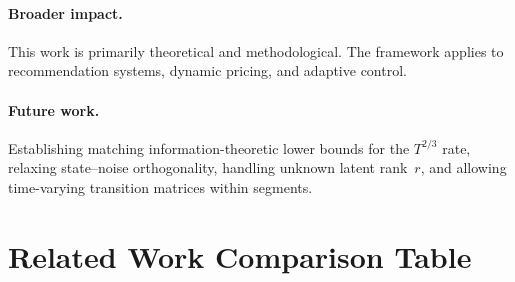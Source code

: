 \documentclass{article}
\begin{document}
\paragraph{Broader impact.}
This work is primarily theoretical and methodological.
The framework applies to recommendation systems, dynamic pricing, and adaptive control.

\paragraph{Future work.}
Establishing matching information-theoretic lower bounds for the $T^{2/3}$ rate, relaxing state--noise orthogonality, handling unknown latent rank~$r$, and allowing time-varying transition matrices within segments.




\newpage
\appendix

\section{Related Work Comparison Table}
\label{app:related_table}
\end{document}
